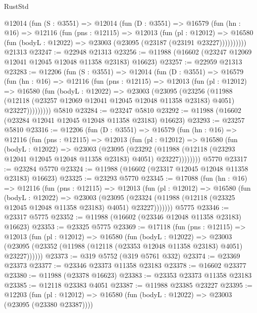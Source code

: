 \begin{lexlean}{RustStd}
\begin{coremodule}
    @12014
      (fun (S : @3551) =>
      @12014
        (fun (D : @3551) =>
        @16579
          (fun (hn : @16) =>
          @12116
            (fun (pns : @12115) =>
            @12013
              (fun (pl : @12012) =>
              @16580 (fun (bodyL : @12022) => @23003 (@23095 (@23187 (@23191 @23227))))))))))
    @21313
@23247 := @22948 @21313
@23256 := @11988 (@16602 (@23247 @12069 @12041 @12045 @12048 @11358 @23183) @16623)
@23257 := @22959 @21313
@23283 := @12206
    (fun (S : @3551) =>
    @12014
      (fun (D : @3551) =>
      @16579
        (fun (hn : @16) =>
        @12116
          (fun (pns : @12115) =>
          @12013
            (fun (pl : @12012) =>
            @16580
              (fun (bodyL : @12022) =>
              @23003
                (@23095
                  (@23256
                    (@11988
                      (@12118 (@23257 @12069 @12041 @12045 @12048 @11358 @23183) @4051)
                      @23227)))))))))
    @5810
@23284 := @23247 @5810
@23292 := @11988 (@16602 (@23284 @12041 @12045 @12048 @11358 @23183) @16623)
@23293 := @23257 @5810
@23316 := @12206
    (fun (D : @3551) =>
    @16579
      (fun (hn : @16) =>
      @12116
        (fun (pns : @12115) =>
        @12013
          (fun (pl : @12012) =>
          @16580
            (fun (bodyL : @12022) =>
            @23003
              (@23095
                (@23292
                  (@11988 (@12118 (@23293 @12041 @12045 @12048 @11358 @23183) @4051) @23227))))))))
    @5770
@23317 := @23284 @5770
@23324 := @11988 (@16602 (@23317 @12045 @12048 @11358 @23183) @16623)
@23325 := @23293 @5770
@23345 := @17088
    (fun (hn : @16) =>
    @12116
      (fun (pns : @12115) =>
      @12013
        (fun (pl : @12012) =>
        @16580
          (fun (bodyL : @12022) =>
          @23003
            (@23095
              (@23324 (@11988 (@12118 (@23325 @12045 @12048 @11358 @23183) @4051) @23227)))))))
    @5775
@23346 := @23317 @5775
@23352 := @11988 (@16602 (@23346 @12048 @11358 @23183) @16623)
@23353 := @23325 @5775
@23369 := @17118
    (fun (pns : @12115) =>
    @12013
      (fun (pl : @12012) =>
      @16580
        (fun (bodyL : @12022) =>
        @23003 (@23095 (@23352 (@11988 (@12118 (@23353 @12048 @11358 @23183) @4051) @23227))))))
@23373 := @319 @5752 (@319 @5761 @332)
@23374 := @23369 @23373
@23377 := @23346 @23373 @11358 @23183
@23378 := @16602 @23377
@23380 := @11988 (@23378 @16623)
@23383 := @23353 @23373 @11358 @23183
@23385 := @12118 @23383 @4051
@23387 := @11988 @23385 @23227
@23395 := @12203
    (fun (pl : @12012) => @16580 (fun (bodyL : @12022) => @23003 (@23095 (@23380 @23387))))

\end{coremodule}
\end{lexlean}
